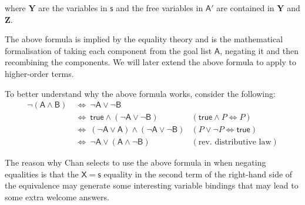 \documentclass[inscr,ack,preface]{dithesis}
\theoremstyle{definition}
\newcommand{\msf}[1]{$\mathsf{#1}$}
\begin{document}
where \msf{\textbf{Y}} are the variables in \msf{s} and the free variables in \msf{A'} are contained in \msf{\textbf{Y}} and \msf{\textbf{Z}}.

The above formula is implied by the equality theory and is the mathematical formalisation of taking each component from the goal list \msf{A}, negating it and then recombining the components. We will later extend the above formula to apply to higher-order terms.

To better understand why the above formula works, consider the following:
\begin{align*}
  \mathsf{\lnot \left( A \land B \right)} & ~\Leftrightarrow~ \mathsf{\lnot A \lor \lnot B} & ~ \\
                                          & ~\Leftrightarrow~ \mathsf{true \land \left( \lnot A \lor \lnot B \right)} & \left( \mathsf{true} \land P \Leftrightarrow P \right) \\
                                          & ~\Leftrightarrow~ \mathsf{\left( \lnot A \lor A \right) \land \left( \lnot A \lor \lnot B \right)} & \left( P \lor \lnot P \Leftrightarrow \mathsf{true} \right) \\
                                          & ~\Leftrightarrow~ \mathsf{\lnot A \lor \left( A \land \lnot B \right)} & (\text{rev. distributive law})
\end{align*}

The reason why Chan selects to use the above formula in \cite{DBLP:conf/iclp/Chan88} when negating equalities is that the \msf{X=s} equality in the second term of the right-hand side of the equivalence may generate some interesting variable bindings that may lead to some extra welcome answers.
\end{document}
